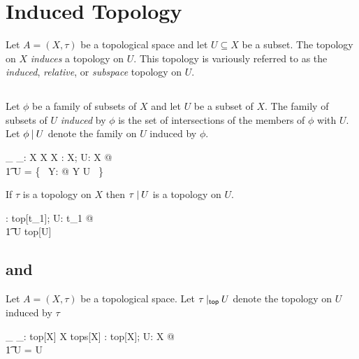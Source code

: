 \documentclass[11pt, oneside]{article}
\begin{document}
\section{Induced Topology}

Let $A = (X, \tau)$ be a topological space and let $U \subseteq X$ be a subset.
The topology on $X$ {\it induces} a topology on $U$.
This topology is variously referred to as the {\it induced}, {\it relative}, or {\it subspace} topology on $U$.

\subsection{}

Let $\phi$ be a family of subsets of $X$ and let $U$ be a subset of $X$.
The family of subsets of $U$ {\it induced} by $\phi$ is the set of intersections of the members of $\phi$ with $U$.
Let $\phi \mathbin{|} U$ denote the family on $U$ induced by $\phi$.

\begin{gendef}[X]
	\_ \inducedFam \_:  \family X \cross \power X \fun \family X
\where
	\forall \phi: \family X; U: \power X @ \\
	\t1	\phi \inducedFam U = \{~ Y: \phi @ Y \cap U ~\}
\end{gendef}

\begin{remark}
If $\tau$ is a topology on $X$ then $\tau \mathbin{|} U$ is a topology on $U$.

\begin{zed}
	\forall \tau: top[t_1]; U: \power t_1 @ \\
	\t1	\tau \inducedFam U \in top[U]
\end{zed}

\end{remark}

\subsection{ and }

Let $A = (X, \tau)$ be a topological space.
Let $\tau \mathbin{|_\mathsf{top}} U$ denote the topology on $U$ induced by $\tau$
\begin{gendef}[X]
	\_ \inducedTop \_: top[X] \cross \power X \fun tops[X]
\where
	\forall \tau: top[X]; U: \power X @ \\
	\t1	\tau \inducedTop U = \tau \inducedFam U
\end{gendef}
\end{document}
